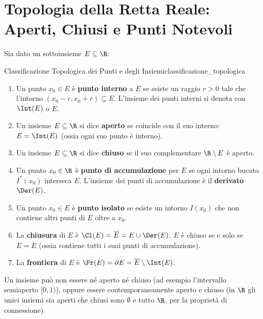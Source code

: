 \section{Topologia della Retta Reale: Aperti, Chiusi e Punti Notevoli}
\label{sec:topologia_retta_reale_dettaglio}

Sia dato un sottoinsieme $E \subseteq \R$:
\begin{definizione}{Classificazione Topologica dei Punti e degli Insiemi}{classificazione_topologica}
\begin{enumerate}
    \item Un punto $x_0 \in E$ è \textbf{punto interno} a $E$ se esiste un raggio $r > 0$ tale che l'intorno $(x_0 - r, x_0 + r) \subseteq E$. L'insieme dei punti interni si denota con $\Int(E)$ o $\mathring{E}$.
    \item Un insieme $E \subseteq \R$ si dice \textbf{aperto} se coincide con il suo interno: $E = \Int(E)$ (ossia ogni suo punto è interno).
    \item Un insieme $E \subseteq \R$ si dice \textbf{chiuso} se il suo complementare $\R \setminus E$ è aperto.
    \item Un punto $x_0 \in \R$ è \textbf{punto di accumulazione} per $E$ se ogni intorno bucato $I^*(x_0)$ interseca $E$. L'insieme dei punti di accumulazione è il \textbf{derivato} $\Der(E)$.
    \item Un punto $x_0 \in E$ è \textbf{punto isolato} se esiste un intorno $I(x_0)$ che non contiene altri punti di $E$ oltre a $x_0$.
    \item La \textbf{chiusura} di $E$ è $\Cl(E) = \overline{E} = E \cup \Der(E)$. $E$ è chiuso se e solo se $E = \overline{E}$ (ossia contiene tutti i suoi punti di accumulazione).
    \item La \textbf{frontiera} di $E$ è $\Fr(E) = \partial E = \overline{E} \setminus \Int(E)$.
\end{enumerate}
\end{definizione}

\begin{osservazione}
Un insieme può non essere né aperto né chiuso (ad esempio l'intervallo semiaperto $[0, 1)$), oppure essere contemporaneamente aperto e chiuso (in $\R$ gli unici insiemi sia aperti che chiusi sono $\emptyset$ e tutto $\R$, per la proprietà di connessione).
\end{osservazione}

